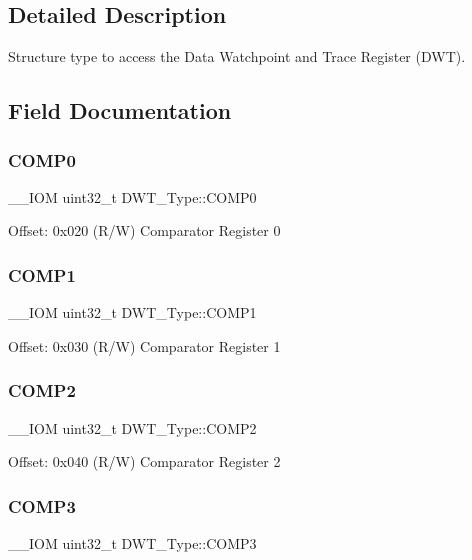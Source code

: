 \subsection{Detailed Description}
Structure type to access the Data Watchpoint and Trace Register (D\+WT). 

\subsection{Field Documentation}
\mbox{\label{structDWT__Type_a61c2965af5bc0643f9af65620b0e67c9}} 
\subsubsection{\texorpdfstring{COMP0}{COMP0}}
{\footnotesize\ttfamily \+\_\+\+\_\+\+I\+OM uint32\+\_\+t D\+W\+T\+\_\+\+Type\+::\+C\+O\+M\+P0}

Offset\+: 0x020 (R/W) Comparator Register 0 \mbox{\label{structDWT__Type_a38714af6b7fa7c64d68f5e1efbe7a931}} 
\subsubsection{\texorpdfstring{COMP1}{COMP1}}
{\footnotesize\ttfamily \+\_\+\+\_\+\+I\+OM uint32\+\_\+t D\+W\+T\+\_\+\+Type\+::\+C\+O\+M\+P1}

Offset\+: 0x030 (R/W) Comparator Register 1 \mbox{\label{structDWT__Type_a5ae6dde39989f27bae90afc2347deb46}} 
\subsubsection{\texorpdfstring{COMP2}{COMP2}}
{\footnotesize\ttfamily \+\_\+\+\_\+\+I\+OM uint32\+\_\+t D\+W\+T\+\_\+\+Type\+::\+C\+O\+M\+P2}

Offset\+: 0x040 (R/W) Comparator Register 2 \mbox{\label{structDWT__Type_a85eb73d1848ac3f82d39d6c3e8910847}} 
\subsubsection{\texorpdfstring{COMP3}{COMP3}}
{\footnotesize\ttfamily \+\_\+\+\_\+\+I\+OM uint32\+\_\+t D\+W\+T\+\_\+\+Type\+::\+C\+O\+M\+P3}

